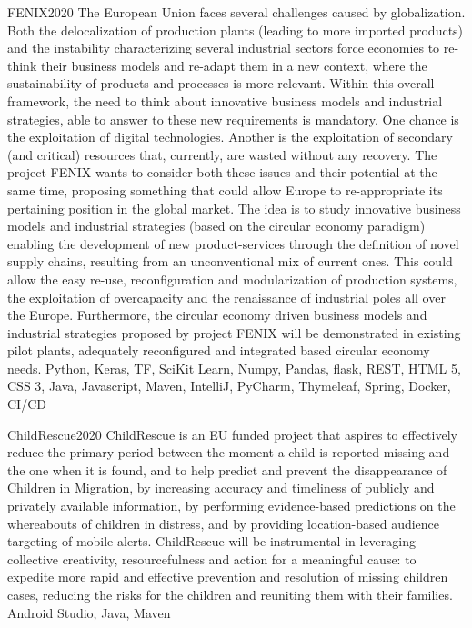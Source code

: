 \begin{projects}
	\project
	{FENIX}{2020}
	{}
	{The European Union faces several challenges caused by globalization. Both the delocalization of production plants (leading to more imported products) and the instability characterizing several industrial sectors force economies to re-think their business models and re-adapt them in a new context, where the sustainability of products and processes is more relevant. Within this overall framework, the need to think about innovative business models and industrial strategies, able to answer to these new requirements is mandatory. One chance is the exploitation of digital technologies. Another is the exploitation of secondary (and critical) resources that, currently, are wasted without any recovery. The project FENIX wants to consider both these issues and their potential at the same time, proposing something that could allow Europe to re-appropriate its pertaining position in the global market. The idea is to study innovative business models and industrial strategies (based on the circular economy paradigm) enabling the development of new product-services through the definition of novel supply chains, resulting from an unconventional mix of current ones. This could allow the easy re-use, reconfiguration and modularization of production systems, the exploitation of overcapacity and the renaissance of industrial poles all over the Europe. Furthermore, the circular economy driven business models and industrial strategies proposed by project FENIX will be demonstrated in existing pilot plants, adequately reconfigured and integrated based circular economy needs.}
	{Python, Keras, TF, SciKit Learn, Numpy, Pandas, flask, REST, HTML 5, CSS 3, Java, Javascript, Maven, IntelliJ, PyCharm, Thymeleaf, Spring, Docker, CI/CD}

	\project
	{ChildRescue}{2020}
	{}
	{ChildRescue is an EU funded project that aspires to effectively reduce the primary period between the moment a child is reported missing and the one when it is found, and to help predict and prevent the disappearance of Children in Migration, by increasing accuracy and timeliness of publicly and privately available information, by performing evidence-based predictions on the whereabouts of children in distress, and by providing location-based audience targeting of mobile alerts. ChildRescue will be instrumental in leveraging collective creativity, resourcefulness and action for a meaningful cause: to expedite more rapid and effective prevention and resolution of missing children cases, reducing the risks for the children and reuniting them with their families.}
	{Android Studio, Java, Maven}


\end{projects}
